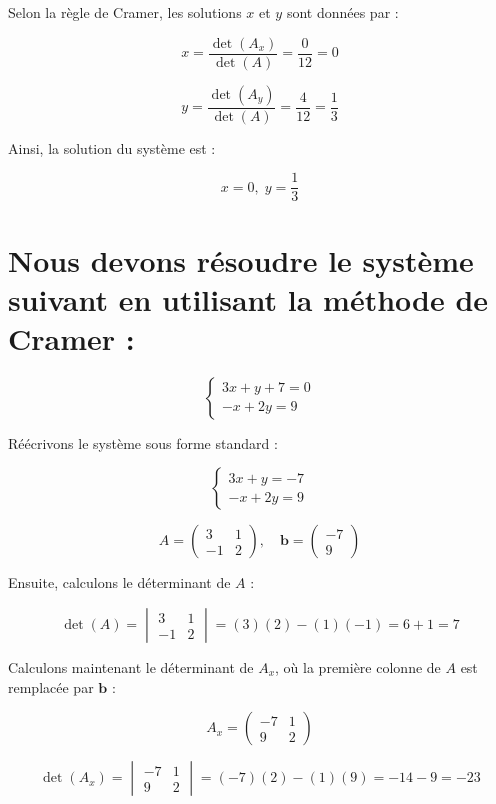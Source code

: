 \documentclass[12pt]{article}
\begin{document}
Selon la règle de Cramer, les solutions $x$ et $y$ sont données par :

\[
x = \frac{\det(A_x)}{\det(A)} = \frac{0}{12} = 0
\]

\[
y = \frac{\det(A_y)}{\det(A)} = \frac{4}{12} = \frac{1}{3}
\]

Ainsi, la solution du système est :

\[
\boxed{x = 0, \; y = \frac{1}{3}}
\]

\section*{Nous devons résoudre le système suivant en utilisant la méthode de Cramer :} 

\[
\begin{cases}
3x + y + 7 = 0 \\
-x + 2y = 9
\end{cases}
\]

Réécrivons le système sous forme standard :

\[
\begin{cases}
3x + y = -7 \\
-x + 2y = 9
\end{cases}
\]

\[
A = \begin{pmatrix}
3 & 1 \\
-1 & 2
\end{pmatrix}, \quad
\mathbf{b} = \begin{pmatrix}
-7 \\
9
\end{pmatrix}
\]

Ensuite, calculons le déterminant de $A$ :

\[
\det(A) = \begin{vmatrix}
3 & 1 \\
-1 & 2
\end{vmatrix} = (3)(2) - (1)(-1) = 6 + 1 = 7
\]

Calculons maintenant le déterminant de $A_x$, où la première colonne de $A$ est remplacée par $\mathbf{b}$ :

\[
A_x = \begin{pmatrix}
-7 & 1 \\
9 & 2
\end{pmatrix}
\]

\[
\det(A_x) = \begin{vmatrix}
-7 & 1 \\
9 & 2
\end{vmatrix} = (-7)(2) - (1)(9) = -14 - 9 = -23
\]
\end{document}
